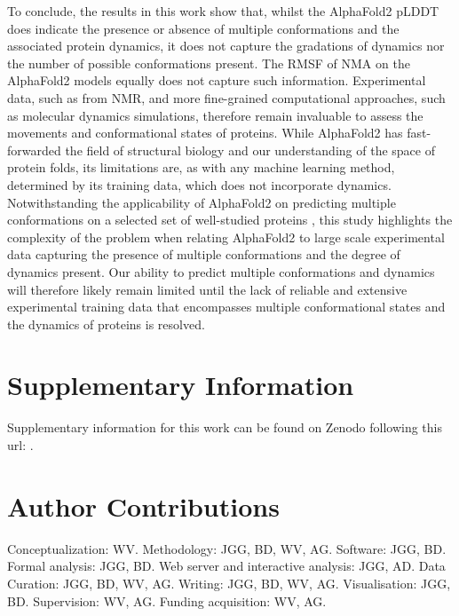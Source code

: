 To conclude, the results in this work show that, whilst the AlphaFold2 pLDDT does indicate the presence or absence of multiple conformations and the associated protein dynamics, it does not capture the gradations of dynamics nor the number of possible conformations present. The RMSF of NMA on the AlphaFold2 models equally does not capture such information. Experimental data, such as from NMR, and more fine-grained computational approaches, such as molecular dynamics simulations, therefore remain invaluable to assess the movements and conformational states of proteins. While AlphaFold2 has fast-forwarded the field of structural biology and our understanding of the space of protein folds,  its limitations are, as with any machine learning method, determined by its training data, which does not incorporate dynamics. Notwithstanding the applicability of AlphaFold2 on predicting multiple conformations on a selected set of well-studied proteins \cite{wayment-steele_predicting_2023}, this study highlights the complexity of the problem when relating AlphaFold2 to large scale experimental data capturing the presence of multiple conformations and the degree of dynamics present. Our ability to predict multiple conformations and dynamics will therefore likely remain limited until the lack of reliable and extensive experimental training data that encompasses multiple conformational states and the dynamics of proteins is resolved.

\section*{Supplementary Information}
Supplementary information for this work can be found on Zenodo following this url: .


\section*{Author Contributions}
Conceptualization: WV.
Methodology: JGG, BD, WV, AG.
Software: JGG, BD.
Formal analysis: JGG, BD.
Web server and interactive analysis: JGG, AD.
Data Curation: JGG, BD, WV, AG.
Writing: JGG, BD, WV, AG.
Visualisation: JGG, BD.
Supervision: WV, AG.
Funding acquisition: WV, AG.


